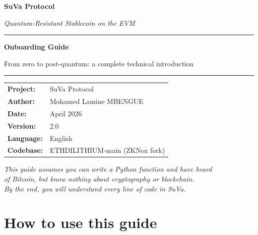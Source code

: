 \documentclass[11pt,a4paper]{article}
\begin{document}

\begin{titlepage}
\centering
\vspace*{2cm}
{\Huge\bfseries\textcolor{suva-blue}{SuVa Protocol}\par}
\vspace{0.5cm}
{\Large\textit{Quantum-Resistant Stablecoin on the EVM}\par}
\vspace{1.5cm}
\rule{\linewidth}{0.5pt}
\vspace{0.5cm}
{\LARGE\bfseries Onboarding Guide\par}
\vspace{0.3cm}
{\large From zero to post-quantum: a complete technical introduction\par}
\vspace{0.5cm}
\rule{\linewidth}{0.5pt}
\vspace{2cm}

\begin{tabular}{ll}
\textbf{Project:}   & SuVa Protocol \\[4pt]
\textbf{Author:}    & Mohamed Lamine MBENGUE \\[4pt]
\textbf{Date:}      & April 2026 \\[4pt]
\textbf{Version:}   & 2.0 \\[4pt]
\textbf{Language:}  & English \\[4pt]
\textbf{Codebase:}  & ETHDILITHIUM-main (ZKNox fork) \\
\end{tabular}

\vfill
\begin{tcolorbox}[enhanced,colback=suva-blue!8,colframe=suva-blue,arc=4mm]
\centering\textit{This guide assumes you can write a Python function and have heard\\
of Bitcoin, but know nothing about cryptography or blockchain.\\
By the end, you will understand every line of code in SuVa.}
\end{tcolorbox}
\end{titlepage}

\tableofcontents
\newpage

\section*{How to use this guide}
\end{document}
